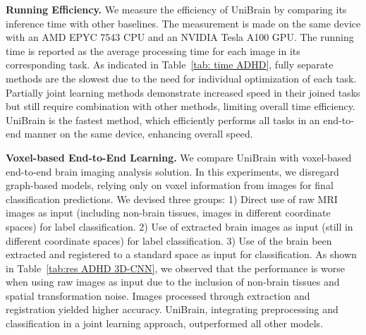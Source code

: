 \vspace{1pt}
\noindent\textbf{Running Efficiency.} We measure the efficiency of UniBrain by comparing its inference time with other baselines. The measurement is made on the same device with an AMD EPYC 7543 CPU and an NVIDIA Tesla A100 GPU.
The running time is reported as the average processing time for each image in its corresponding
task.
As indicated in Table~\ref{tab: time ADHD}, fully separate methods are the slowest due to the need for individual optimization of each task. Partially joint learning methods demonstrate increased speed in their joined tasks but still require combination with other methods, limiting overall time efficiency.
UniBrain is the fastest method, which efficiently performs all tasks in an end-to-end manner on the same device, enhancing overall speed.

\vspace{1pt}
\noindent\textbf{Voxel-based End-to-End Learning.} We compare UniBrain with voxel-based end-to-end brain imaging analysis solution. In this experiments, we disregard graph-based models, relying only on voxel information from images for final classification predictions. 
We devised three groups: 1) Direct use of raw MRI images as input (including non-brain tissues, images in different coordinate spaces) for label classification. 2) Use of extracted brain images as input (still in different coordinate spaces) for label classification. 3) Use of the brain been extracted and registered to a standard space as input for classification. As shown in Table~\ref{tab:res ADHD 3D-CNN}, we observed that the performance is worse when using raw images as input due to the inclusion of non-brain tissues and spatial transformation noise. Images processed through extraction and registration yielded higher accuracy. UniBrain, integrating preprocessing and classification in a joint learning approach, outperformed all other models.


